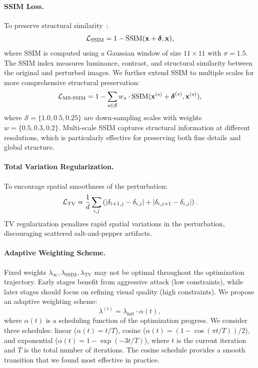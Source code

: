 \paragraph{SSIM Loss.} To preserve structural similarity~\cite{wang2004image}:
\begin{equation}
    {\cal L}_{\text{SSIM}} = 1 - \text{SSIM}(\mathbf{x} + \boldsymbol{\delta}, \mathbf{x}),
\end{equation}
where SSIM is computed using a Gaussian window of size $11 \times 11$ with $\sigma = 1.5$. The SSIM index measures luminance, contrast, and structural similarity between the original and perturbed images. We further extend SSIM to multiple scales for more comprehensive structural preservation:
\begin{equation}
    {\cal L}_{\text{MS-SSIM}} = 1 - \sum_{s \in \mathcal{S}} w_s \cdot \text{SSIM}(\mathbf{x}^{(s)} + \boldsymbol{\delta}^{(s)}, \mathbf{x}^{(s)}),
\end{equation}
where $\mathcal{S} = \{1.0, 0.5, 0.25\}$ are down-sampling scales with weights $w = \{0.5, 0.3, 0.2\}$. Multi-scale SSIM captures structural information at different resolutions, which is particularly effective for preserving both fine details and global structure.

\paragraph{Total Variation Regularization.} To encourage spatial smoothness of the perturbation:
\begin{equation}
    {\cal L}_{\text{TV}} = \frac{1}{d} \sum_{i,j} \left( \left|\delta_{i+1,j} - \delta_{i,j}\right| + \left|\delta_{i,j+1} - \delta_{i,j}\right| \right).
\end{equation}
TV regularization penalizes rapid spatial variations in the perturbation, discouraging scattered salt-and-pepper artifacts.

\paragraph{Adaptive Weighting Scheme.} Fixed weights $\lambda_{\infty}, \lambda_{\text{SSIM}}, \lambda_{\text{TV}}$ may not be optimal throughout the optimization trajectory. Early stages benefit from aggressive attack (low constraints), while later stages should focus on refining visual quality (high constraints). We propose an adaptive weighting scheme:
\begin{equation}
    \lambda^{(t)} = \lambda_{\text{init}} \cdot \alpha(t),
\end{equation}
where $\alpha(t)$ is a scheduling function of the optimization progress. We consider three schedules: linear ($\alpha(t) = t / T$), cosine ($\alpha(t) = (1 - \cos(\pi t / T)) / 2$), and exponential ($\alpha(t) = 1 - \exp(-3t / T)$), where $t$ is the current iteration and $T$ is the total number of iterations. The cosine schedule provides a smooth transition that we found most effective in practice.

